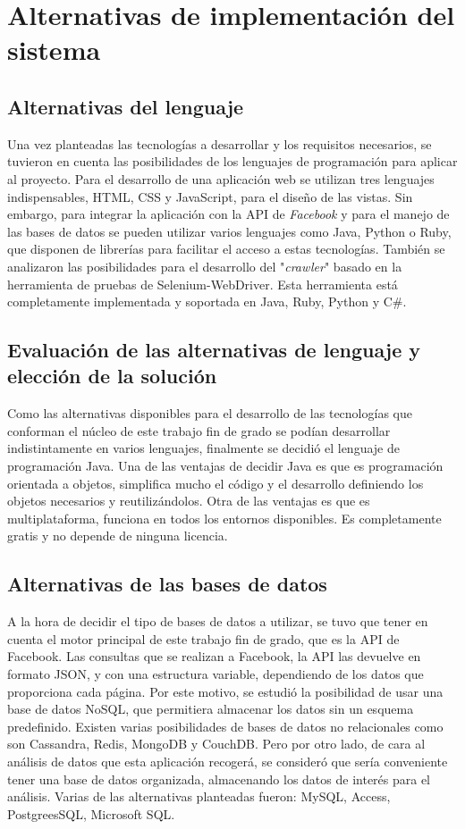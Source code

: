 \section{Alternativas de implementación del sistema}
\subsection{Alternativas del lenguaje}
Una vez planteadas las tecnologías a desarrollar y los requisitos necesarios, se tuvieron en cuenta las posibilidades de los lenguajes de programación para aplicar al proyecto. 
Para el desarrollo de una aplicación web se utilizan tres lenguajes indispensables, HTML, CSS y JavaScript, para el diseño de las vistas. Sin embargo, para integrar la aplicación con la API de \textit{Facebook} y para el manejo de las bases de datos se pueden utilizar varios lenguajes como Java, Python o Ruby, que disponen de librerías para facilitar el acceso a estas tecnologías.
También se analizaron las posibilidades para el desarrollo del "\textit{crawler}" basado en la herramienta de pruebas de Selenium-WebDriver. Esta herramienta está completamente implementada y soportada en Java, Ruby, Python y C\#. 
\subsection{Evaluación de las alternativas de lenguaje y elección de la solución}
Como las alternativas disponibles para el desarrollo de las tecnologías que conforman el núcleo de este trabajo fin de grado se podían desarrollar indistintamente en varios lenguajes, finalmente se decidió el lenguaje de programación Java. 
Una de las ventajas de decidir Java es que es programación orientada a objetos, simplifica mucho el código y el desarrollo definiendo los objetos necesarios y reutilizándolos. Otra de las ventajas es que es multiplataforma, funciona en todos los entornos disponibles. Es completamente gratis y no depende de ninguna licencia. 
\subsection{Alternativas de las bases de datos}
A la hora de decidir el tipo de bases de datos a utilizar, se tuvo que tener en cuenta el motor principal de este trabajo fin de grado, que es la API de Facebook. Las consultas que se realizan a Facebook, la API las devuelve en formato JSON, y con una estructura variable, dependiendo de los datos que proporciona cada página. 
Por este motivo, se estudió la posibilidad de usar una base de datos NoSQL, que permitiera almacenar los datos sin un esquema predefinido.
Existen varias posibilidades de bases de datos no relacionales como son Cassandra, Redis, MongoDB y CouchDB.
Pero por otro lado, de cara al análisis de datos que esta aplicación recogerá, se consideró que sería conveniente tener una base de datos organizada, almacenando los datos de interés para el análisis. Varias de las alternativas planteadas fueron: MySQL, Access, PostgreesSQL, Microsoft SQL.  
